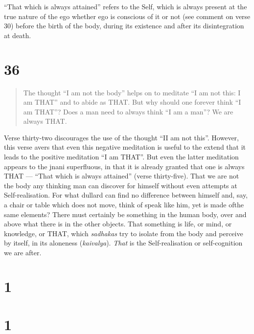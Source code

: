 \documentclass[12pt]{report}
\begin{document}
{``That which is always attained'' refers to the Self, which is always
present at the true nature of the ego whether ego is conscious of it
or not (see comment on verse 30) before the birth of the body, during
its existence and after its disintegration at death.

\section*{36}

\begin{quote}
  The thought ``I am not the body'' helps on to meditate ``I am not
  this: I am THAT'' and to abide as THAT. But why should one forever
  think ``I am THAT''? Does a man need to always think ``I am a man''?
  We are always THAT.
\end{quote}

\index{}

Verse thirty-two discourages the use of the thought ``II am not
this''. However, this verse avers that even this negative meditation
is useful to the extend that it leads to the positive meditation ``I
am THAT''. But even the latter meditation appears to the jnani
superfluous, in that it is already granted that one is always THAT ---
``That which is always attained'' (verse thirty-five). That we are not
the body any thinking man can discover for himself without even
attempts at Self-realisation. For what dullard can find no difference
between himself and, say, a chair or table which does not move, think
of speak like him, yet is made ofthe same elements? There must
certainly be something in the human body, over and above what there is
in the other objects. That something is life, or mind, or knowledge,
or THAT, which \emph{sadhakas} try to isolate from the body and
perceive by itself, in its aloneness (\emph{kaivalya}). \emph{That} is
the Self-realisation or self-cognition we are after.

\section*{1}

\begin{quote}

\end{quote}


\section*{1}

}
\end{document}

